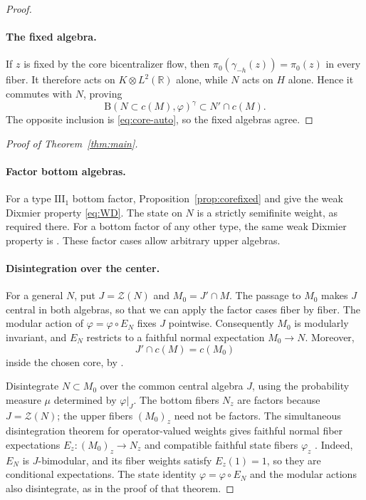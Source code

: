 \documentclass[11pt]{article}
\theoremstyle{definition}
\newcommand{\B}{\mathrm B}
\newcommand{\R}{\mathbb R}
\begin{document}
\begin{proof}
\paragraph{The fixed algebra.}
If $z$ is fixed by the core bicentralizer flow, then
$\pi_0(\gamma_{-h}(z))=\pi_0(z)$ in every fiber. It therefore acts on
$K\otimes L^2(\R)$ alone, while $N$ acts on $H$ alone. Hence it commutes
with $N$, proving
\[
 \B(N\subset c(M),\varphi)^\gamma\subset N'\cap c(M).
\]
The opposite inclusion is \eqref{eq:core-auto}, so the fixed algebras agree.
\end{proof}

\begin{proof}[Proof of Theorem~\ref{thm:main}]
\leavevmode
\paragraph{Factor bottom algebras.}
For a type $\mathrm{III}_1$ bottom factor,
Proposition~\ref{prop:corefixed} and \cite[Proposition~8.6 and Theorem~D]{M1}
give the weak Dixmier property \eqref{eq:WD}. The state on $N$ is a strictly
semifinite weight, as required there. For a bottom factor of any other type,
the same weak Dixmier property is \cite[Proposition~4.11]{M1}.
These factor cases allow arbitrary upper algebras.

\paragraph{Disintegration over the center.}
For a general $N$, put $J=\mathcal Z(N)$ and $M_0=J'\cap M$.
The passage to $M_0$ makes $J$ central in both algebras, so that we can
apply the factor cases fiber by fiber.
The modular action of $\varphi=\varphi\circ E_N$ fixes $J$ pointwise.
Consequently $M_0$ is modularly invariant, and $E_N$ restricts to a faithful
normal expectation $M_0\to N$. Moreover,
\begin{equation}\label{eq:center-core}
 J'\cap c(M)=c(M_0)
\end{equation}
inside the chosen core, by \cite[Proposition~4.7]{M1}.

Disintegrate $N\subset M_0$ over the common central algebra $J$, using the
probability measure $\mu$ determined by $\varphi|_J$.
The bottom fibers $N_z$ are factors because $J=\mathcal Z(N)$; the upper
fibers $(M_0)_z$ need not be factors. The simultaneous disintegration theorem
for operator-valued weights gives faithful normal fiber expectations
$E_z:(M_0)_z\to N_z$ and compatible faithful state fibers $\varphi_z$
\cite[Propositions~2.1--2.2 and Theorem~2.3]{IK2007}.
Indeed, $E_N$ is $J$-bimodular, and its fiber weights satisfy $E_z(1)=1$,
so they are conditional expectations. The state identity
$\varphi=\varphi\circ E_N$ and the modular actions also disintegrate,
as in the proof of that theorem.


\end{proof}
\end{document}
